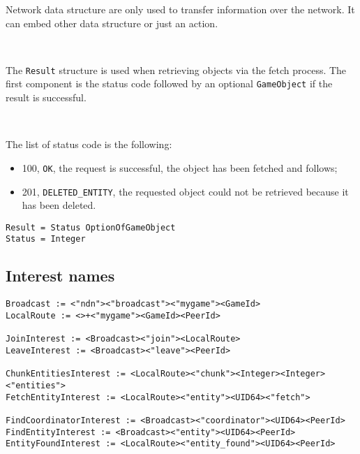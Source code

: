 Network data structure are only used to transfer information over the network. It can embed other data structure or just an action.

~

The \verb+Result+ structure is used when retrieving objects via the fetch process. The first component is the status code followed by an optional \verb+GameObject+ if the result is successful.

~

The list of status code is the following:
\begin{itemize}
  \item 100, \verb+OK+, the request is successful, the object has been fetched and follows;
  \item 201, \verb+DELETED_ENTITY+, the requested object could not be retrieved because it has been deleted.
\end{itemize}

\begin{lstlisting}
Result = Status OptionOfGameObject
Status = Integer
\end{lstlisting}

\subsection{Interest names}

\begin{lstlisting}
Broadcast := <"ndn"><"broadcast"><"mygame"><GameId>
LocalRoute := <>+<"mygame"><GameId><PeerId>

JoinInterest := <Broadcast><"join"><LocalRoute>
LeaveInterest := <Broadcast><"leave"><PeerId>

ChunkEntitiesInterest := <LocalRoute><"chunk"><Integer><Integer><"entities">
FetchEntityInterest := <LocalRoute><"entity"><UID64><"fetch">

FindCoordinatorInterest := <Broadcast><"coordinator"><UID64><PeerId>
FindEntityInterest := <Broadcast><"entity"><UID64><PeerId>
EntityFoundInterest := <LocalRoute><"entity_found"><UID64><PeerId>
\end{lstlisting}
